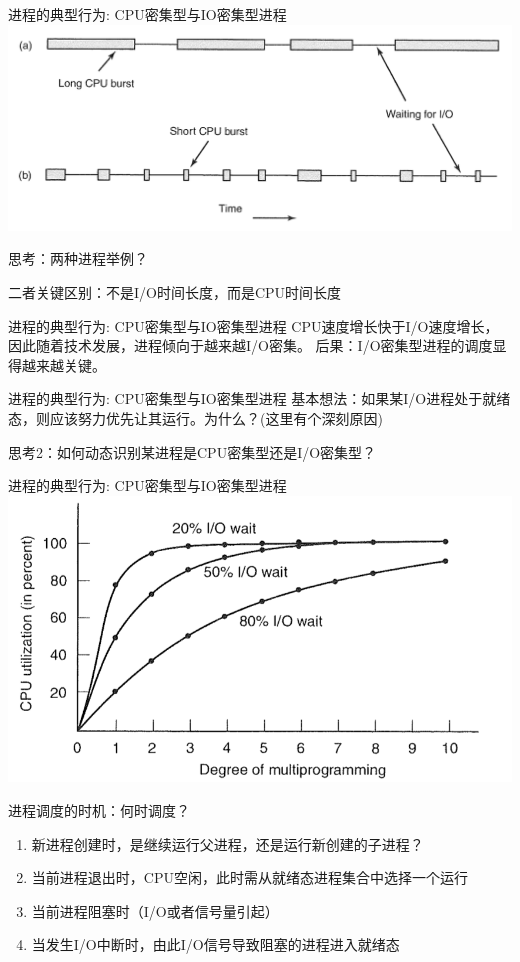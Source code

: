 \documentclass[xcolor=svgnames]{beamer}
\begin{document}
\begin{CJK*}{UTF8}{gbsn}
\begin{frame}{进程的典型行为: CPU密集型与IO密集型进程}
\includegraphics[width=1.0\textwidth]{behav.png}

思考：两种进程举例？

二者关键区别：不是I/O时间长度，而是CPU时间长度
\end{frame}

\begin{frame}{进程的典型行为: CPU密集型与IO密集型进程}
CPU速度增长快于I/O速度增长，因此随着技术发展，进程倾向于越来越I/O密集。
后果：I/O密集型进程的调度显得越来越关键。
\end{frame}

\begin{frame}{进程的典型行为: CPU密集型与IO密集型进程}
基本想法：如果某I/O进程处于就绪态，则应该努力优先让其运行。为什么？(这里有个深刻原因)

思考2：如何动态识别某进程是CPU密集型还是I/O密集型？
\end{frame}

\begin{frame}{进程的典型行为: CPU密集型与IO密集型进程}
\includegraphics[width=1.0\textwidth]{util.png}
\end{frame}

\begin{frame}{进程调度的时机：何时调度？}
\begin{enumerate}
\item 新进程创建时，是继续运行父进程，还是运行新创建的子进程？
\item 当前进程退出时，CPU空闲，此时需从就绪态进程集合中选择一个运行
\item 当前进程阻塞时（I/O或者信号量引起）
\item 当发生I/O中断时，由此I/O信号导致阻塞的进程进入就绪态
\end{enumerate}
\end{frame}


\end{CJK*}
\end{document}
